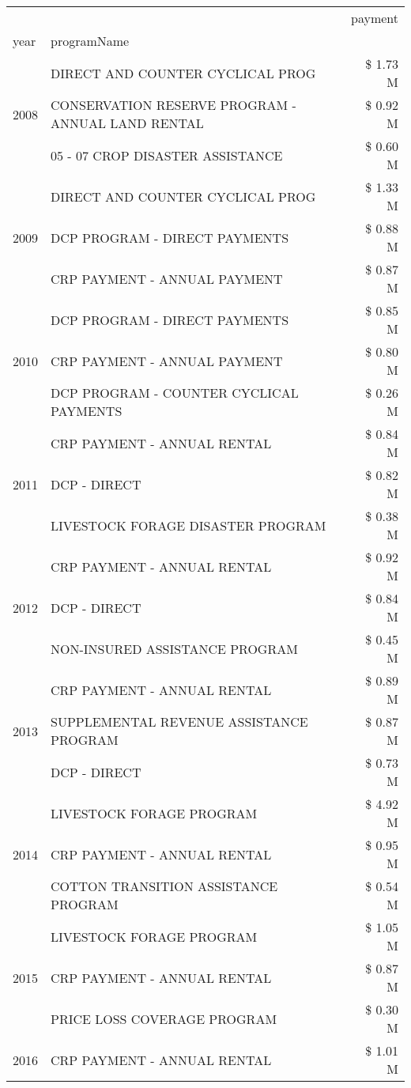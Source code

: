 \begin{tabular}{llr}
\toprule
 &  & payment \\
year & programName &  \\
\midrule
\multirow[t]{3}{*}{2008} & DIRECT AND COUNTER CYCLICAL PROG & \$ 1.73 M \\
 & CONSERVATION RESERVE PROGRAM - ANNUAL LAND RENTAL & \$ 0.92 M \\
 & 05 - 07 CROP DISASTER ASSISTANCE & \$ 0.60 M \\
\cline{1-3}
\multirow[t]{3}{*}{2009} & DIRECT AND COUNTER CYCLICAL PROG & \$ 1.33 M \\
 & DCP PROGRAM - DIRECT PAYMENTS & \$ 0.88 M \\
 & CRP PAYMENT - ANNUAL PAYMENT & \$ 0.87 M \\
\cline{1-3}
\multirow[t]{3}{*}{2010} & DCP PROGRAM - DIRECT PAYMENTS & \$ 0.85 M \\
 & CRP PAYMENT - ANNUAL PAYMENT & \$ 0.80 M \\
 & DCP PROGRAM - COUNTER CYCLICAL PAYMENTS & \$ 0.26 M \\
\cline{1-3}
\multirow[t]{3}{*}{2011} & CRP PAYMENT - ANNUAL RENTAL & \$ 0.84 M \\
 & DCP - DIRECT & \$ 0.82 M \\
 & LIVESTOCK FORAGE DISASTER PROGRAM & \$ 0.38 M \\
\cline{1-3}
\multirow[t]{3}{*}{2012} & CRP PAYMENT - ANNUAL RENTAL & \$ 0.92 M \\
 & DCP - DIRECT & \$ 0.84 M \\
 & NON-INSURED ASSISTANCE PROGRAM & \$ 0.45 M \\
\cline{1-3}
\multirow[t]{3}{*}{2013} & CRP PAYMENT - ANNUAL RENTAL & \$ 0.89 M \\
 & SUPPLEMENTAL REVENUE ASSISTANCE PROGRAM & \$ 0.87 M \\
 & DCP - DIRECT & \$ 0.73 M \\
\cline{1-3}
\multirow[t]{3}{*}{2014} & LIVESTOCK FORAGE PROGRAM & \$ 4.92 M \\
 & CRP PAYMENT - ANNUAL RENTAL & \$ 0.95 M \\
 & COTTON TRANSITION ASSISTANCE PROGRAM & \$ 0.54 M \\
\cline{1-3}
\multirow[t]{3}{*}{2015} & LIVESTOCK FORAGE PROGRAM & \$ 1.05 M \\
 & CRP PAYMENT - ANNUAL RENTAL & \$ 0.87 M \\
 & PRICE LOSS COVERAGE PROGRAM & \$ 0.30 M \\
\cline{1-3}
\multirow[t]{3}{*}{2016} & CRP PAYMENT - ANNUAL RENTAL & \$ 1.01 M \\

\end{tabular}
